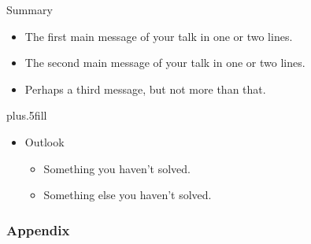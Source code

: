 \documentclass[
aspectratio=169,
11pt,
c,
compress,
hyperref={
  colorlinks=false,
}]{beamer}
\begin{document}
\begin{frame}{Summary}

  \begin{itemize}
    \item
          The \alert{first main message} of your talk in one or two lines.
    \item
          The \alert{second main message} of your talk in one or two lines.
    \item
          Perhaps a \alert{third message}, but not more than that.
  \end{itemize}

  \vskip0pt plus.5fill
  \begin{itemize}
    \item
          Outlook
          \begin{itemize}
            \item
                  Something you haven't solved.
            \item
                  Something else you haven't solved.
          \end{itemize}
  \end{itemize}
\end{frame}

\appendix

\begin{frame}[c]
  \frametitle{Appendix}

\end{frame}
\end{document}

